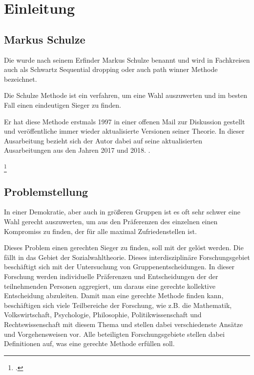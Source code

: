 \section{Einleitung}
\label{sec:Einleitung}


\subsection{Markus Schulze} 
\label{sec:markusSchulze}
Die \schulze wurde nach seinem Erfinder Markus Schulze benannt und wird in Fachkreisen auch als \glqq Schwartz Sequential dropping\grqq{} oder auch \glqq path winner\grqq{} Methode bezeichnet.

Die Schulze Methode ist ein verfahren, um eine Wahl auszuwerten und im besten Fall einen eindeutigen Sieger zu finden.

Er hat diese Methode erstmals 1997 in einer offenen Mail zur Diskussion gestellt \citep{Schulze1997} und veröffentliche immer wieder aktualisierte Versionen seiner Theorie. In dieser Ausarbeitung bezieht sich der Autor dabei auf seine aktualisierten Ausarbeitungen aus den Jahren 2017 und 2018. .

\footcite[vgl.]{Schulze2018}

\subsection{Problemstellung} 
\label{sec:problemstellung}
In einer Demokratie, aber auch in größeren Gruppen ist es oft sehr schwer eine Wahl gerecht auszuwerten, um aus den Präferenzen des einzelnen einen Kompromiss zu finden, der für alle maximal Zufriedenstellen ist.

Dieses Problem einen gerechten Sieger zu finden, soll mit der \schulze gelöst werden. Die \schulze fällt in das Gebiet der Sozialwahltheorie. Dieses interdisziplinäre Forschungsgebiet beschäftigt sich mit der Untersuchung von Gruppenentscheidungen. In dieser Forschung werden individuelle Präferenzen und Entscheidungen der der teilnehmenden Personen aggregiert, um daraus eine \glqq gerechte\grqq{} kollektive Entscheidung abzuleiten. Damit man eine \glqq gerechte\grqq{} Methode finden kann, beschäftigen sich viele Teilbereiche der Forschung, wie z.B. die Mathematik, Volkswirtschaft, Psychologie, Philosophie, Politikwissenschaft und Rechtswissenschaft mit diesem Thema und stellen dabei verschiedenste Ansätze und Vorgehensweisen vor. Alle beteiligten Forschungsgebiete stellen dabei Definitionen auf, was eine \glqq gerechte\grqq{} Methode erfüllen soll. \citep{scheubrein2013computerunterstuetzte}

